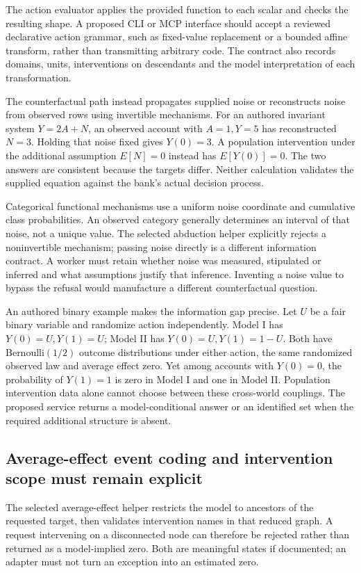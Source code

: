 The action evaluator applies the provided function to each scalar and
checks the resulting shape. A proposed CLI or MCP interface should accept
a reviewed declarative action grammar, such as fixed-value replacement
or a bounded affine transform, rather than transmitting arbitrary code.
The contract also records domains, units, interventions on descendants
and the model interpretation of each transformation.
\citep{exec24_gcm_source,exec24_gcm_choice}

The counterfactual path instead propagates supplied noise or reconstructs
noise from observed rows using invertible mechanisms. For an authored
invariant system $Y=2A+N$, an observed account with $A=1,Y=5$ has
reconstructed $N=3$. Holding that noise fixed gives $Y(0)=3$.
A population intervention under the additional assumption $E[N]=0$
instead has $E[Y(0)]=0$. The two answers are consistent because the
targets differ. Neither calculation validates the supplied equation
against the bank's actual decision process.\citep{exec24_gcm_choice}

Categorical functional mechanisms use a uniform noise coordinate and
cumulative class probabilities. An observed category generally determines
an interval of that noise, not a unique value. The selected abduction
helper explicitly rejects a noninvertible mechanism; passing noise
directly is a different information contract. A worker must retain whether
noise was measured, stipulated or inferred and what assumptions justify
that inference. Inventing a noise value to bypass the refusal would
manufacture a different counterfactual question.
\citep{exec24_gcm_source,exec24_gcm_choice}

An authored binary example makes the information gap precise. Let
$U$ be a fair binary variable and randomize action independently. Model
I has $Y(0)=U,Y(1)=U$; Model II has $Y(0)=U,Y(1)=1-U$.
Both have Bernoulli$(1/2)$ outcome distributions under either action,
the same randomized observed law and average effect zero. Yet among
accounts with $Y(0)=0$, the probability of $Y(1)=1$ is zero in Model I
and one in Model II. Population intervention data alone cannot choose
between these cross-world couplings. The proposed service returns a
model-conditional answer or an identified set when the required additional
structure is absent.\citep{exec24_gcm_choice}

\subsection{Average-effect event coding and intervention scope must remain explicit}
The selected average-effect helper restricts the model to ancestors of
the requested target, then validates intervention names in that reduced
graph. A request intervening on a disconnected node can therefore be
rejected rather than returned as a model-implied zero. Both are meaningful
states if documented; an adapter must not turn an exception into an
estimated zero.\citep{exec24_gcm_source,exec24_gcm_choice}

